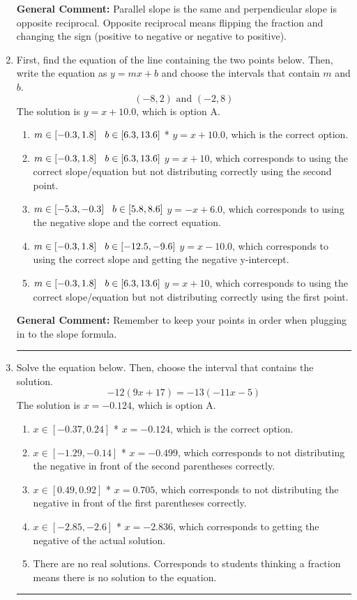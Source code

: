\documentclass{extbook}[14pt]
\newcommand{\litem}[1]{\item #1

\rule{\textwidth}{0.4pt}}
\begin{document}
\begin{enumerate}
{\textbf{General Comment:} Parallel slope is the same and perpendicular slope is opposite reciprocal. Opposite reciprocal means flipping the fraction and changing the sign (positive to negative or negative to positive).
}
\litem{
First, find the equation of the line containing the two points below. Then, write the equation as $ y=mx+b $ and choose the intervals that contain $m$ and $b$.
\[ (-8, 2) \text{ and } (-2, 8) \]
The solution is \( y = x + 10.0 \), which is option A.\begin{enumerate}[label=\Alph*.]
\item \( m \in [-0.3, 1.8] \hspace*{3mm} b \in [6.3, 13.6] \)
* $y = x + 10.0$, which is the correct option.
\item \( m \in [-0.3, 1.8] \hspace*{3mm} b \in [6.3, 13.6] \)
 $y = x + 10$, which corresponds to using the correct slope/equation but not distributing correctly using the second point.
\item \( m \in [-5.3, -0.3] \hspace*{3mm} b \in [5.8, 8.6] \)
 $y = -x + 6.0$, which corresponds to using the negative slope and the correct equation.
\item \( m \in [-0.3, 1.8] \hspace*{3mm} b \in [-12.5, -9.6] \)
 $y = x -10.0$, which corresponds to using the correct slope and getting the negative y-intercept.
\item \( m \in [-0.3, 1.8] \hspace*{3mm} b \in [6.3, 13.6] \)
 $y = x + 10$, which corresponds to using the correct slope/equation but not distributing correctly using the first point.
\end{enumerate}

\textbf{General Comment:} Remember to keep your points in order when plugging in to the slope formula.
}
\litem{
Solve the equation below. Then, choose the interval that contains the solution.
\[ -12(9x + 17) = -13(-11x -5) \]
The solution is \( x = -0.124 \), which is option A.\begin{enumerate}[label=\Alph*.]
\item \( x \in [-0.37, 0.24] \)
* $x = -0.124$, which is the correct option.
\item \( x \in [-1.29, -0.14] \)
* $x = -0.499$, which corresponds to not distributing the negative in front of the second parentheses correctly.
\item \( x \in [0.49, 0.92] \)
* $x = 0.705$, which corresponds to not distributing the negative in front of the first parentheses correctly.
\item \( x \in [-2.85, -2.6] \)
* $x = -2.836$, which corresponds to getting the negative of the actual solution.
\item \( \text{There are no real solutions.} \)
Corresponds to students thinking a fraction means there is no solution to the equation.
\end{enumerate}

}
\end{enumerate}
\end{document}
